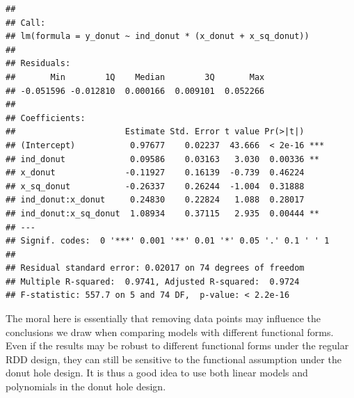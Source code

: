 \documentclass[
  11pt,
]{article}
\begin{document}
\begin{verbatim}
## 
## Call:
## lm(formula = y_donut ~ ind_donut * (x_donut + x_sq_donut))
## 
## Residuals:
##       Min        1Q    Median        3Q       Max 
## -0.051596 -0.012810  0.000166  0.009101  0.052266 
## 
## Coefficients:
##                      Estimate Std. Error t value Pr(>|t|)    
## (Intercept)           0.97677    0.02237  43.666  < 2e-16 ***
## ind_donut             0.09586    0.03163   3.030  0.00336 ** 
## x_donut              -0.11927    0.16139  -0.739  0.46224    
## x_sq_donut           -0.26337    0.26244  -1.004  0.31888    
## ind_donut:x_donut     0.24830    0.22824   1.088  0.28017    
## ind_donut:x_sq_donut  1.08934    0.37115   2.935  0.00444 ** 
## ---
## Signif. codes:  0 '***' 0.001 '**' 0.01 '*' 0.05 '.' 0.1 ' ' 1
## 
## Residual standard error: 0.02017 on 74 degrees of freedom
## Multiple R-squared:  0.9741, Adjusted R-squared:  0.9724 
## F-statistic: 557.7 on 5 and 74 DF,  p-value: < 2.2e-16
\end{verbatim}

The moral here is essentially that removing data points may influence
the conclusions we draw when comparing models with different functional
forms. Even if the results may be robust to different functional forms
under the regular RDD design, they can still be sensitive to the
functional assumption under the donut hole design. It is thus a good
idea to use both linear models and polynomials in the donut hole design.
\end{document}
